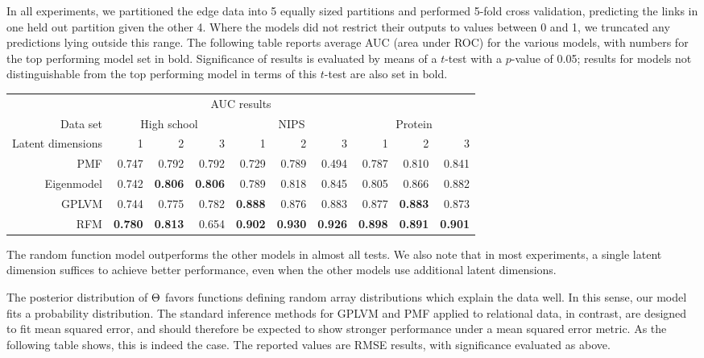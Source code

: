 In all experiments, we partitioned the edge data into 5 equally sized partitions and performed 5-fold cross validation, predicting the links in one held out partition given the other 4. 
Where the models did not restrict their outputs to values between 0 and 1, we truncated any predictions lying outside this range.
The following table reports average AUC (area under ROC) for the various models, with numbers for the top performing model set in bold.
Significance of results is evaluated by means of a $t$-test with a $p$-value of 0.05; results for models not distinguishable from the top performing model
in terms of this $t$-test are also set in bold. 

\begin{center}
  \begin{tabular}{r | r r r | r r r | r r r}
    \multicolumn{10}{c}{AUC results} \\
    \addlinespace[2pt]
    Data set & \multicolumn{3}{c|}{High school} & \multicolumn{3}{c|}{NIPS} & \multicolumn{3}{c}{Protein} \\
    Latent dimensions & 1 & 2 & 3 & 1 & 2 & 3 & 1 & 2 & 3 \\
    \midrule
    PMF                   & 0.747 & 0.792 & 0.792 & 0.729 & 0.789 & 0.494 & 0.787 & 0.810 & 0.841 \\
    Eigenmodel            & 0.742 & \textbf{0.806} & \textbf{0.806} & 0.789 & 0.818 & 0.845 & 0.805 & 0.866 & 0.882 \\
    GPLVM                 & 0.744 & 0.775 & 0.782 & \textbf{0.888} & 0.876 & 0.883 & 0.877 & \textbf{0.883} & 0.873 \\
    RFM & \textbf{0.780} & \textbf{0.813} & 0.654 & \textbf{0.902} & \textbf{0.930} & \textbf{0.926} & \textbf{0.898} & \textbf{0.891} & \textbf{0.901} \\
  \end{tabular}
\end{center}

The random function model outperforms the other models in almost all tests. We also note that in most experiments, a single latent dimension
suffices to achieve better performance, even when the other models use additional latent dimensions.

The posterior distribution of $\Theta$ favors functions defining random array distributions which explain the data well. In this sense,
our model fits a probability distribution. The standard inference methods for GPLVM and PMF applied to relational data, in contrast, are designed to fit mean squared error, and should therefore
be expected to show stronger performance under a mean squared error metric. As the following table shows, this is indeed the case.
The reported values are RMSE results,  with significance evaluated as above.

